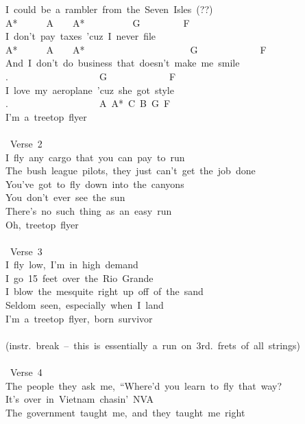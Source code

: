{I\ could\ be\ a\ rambler\ from\ the\ Seven\ Isles\ (??)\\
A*\ \ \ \ \ \ A\ \ \ \ A*\ \ \ \ \ \ \ \ \ \ G\ \ \ \ \ \ \ \ \ F\\
I\ don't\ pay\ taxes\ 'cuz\ I\ never\ file\\
A*\ \ \ \ \ \ A\ \ \ \ A*\ \ \ \ \ \ \ \ \ \ \ \ \ \ \ \ \ \ \ \ \ \ G\ \ \ \ \ \ \ \ \ \ \ \ \ F\\
And\ I\ don't\ do\ business\ that\ doesn't\ make\ me\ smile\\
.\ \ \ \ \ \ \ \ \ \ \ \ \ \ \ \ \ \ \ G\ \ \ \ \ \ \ \ \ \ \ \ \ F\\
I\ love\ my\ aeroplane\ 'cuz\ she\ got\ style\\
.\ \ \ \ \ \ \ \ \ \ \ \ \ \ \ \ \ \ \ A\ A*\ C\ B\ G\ F\\
I'm\ a\ treetop\ flyer\\
\\
\lbrack\ Verse\ 2\rbrack\\
I\ fly\ any\ cargo\ that\ you\ can\ pay\ to\ run\\
The\ bush\ league\ pilots,\ they\ just\ can't\ get\ the\ job\ done\\
You've\ got\ to\ fly\ down\ into\ the\ canyons\\
You\ don't\ ever\ see\ the\ sun\\
There's\ no\ such\ thing\ as\ an\ easy\ run\\
Oh,\ treetop\ flyer\\
\\
\lbrack\ Verse\ 3\rbrack\\
I\ fly\ low,\ I'm\ in\ high\ demand\\
I\ go\ 15\ feet\ over\ the\ Rio\ Grande\\
I\ blow\ the\ mesquite\ right\ up\ off\ of\ the\ sand\\
Seldom\ seen,\ especially\ when\ I\ land\\
I'm\ a\ treetop\ flyer,\ born\ survivor\\
\\
(instr.\ break\ --\ this\ is\ essentially\ a\ run\ on\ 3rd.\ frets\ of\ all\ strings)\\
\\
\lbrack\ Verse\ 4\rbrack\\
The\ people\ they\ ask\ me,\ ``Where'd\ you\ learn\ to\ fly\ that\ way?\;\\
It's\ over\ in\ Vietnam\ chasin'\ NVA\\
The\ government\ taught\ me,\ and\ they\ taught\ me\ right\\
}
